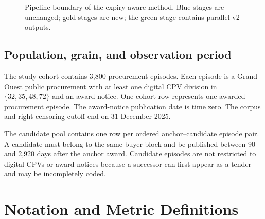 \documentclass[11pt,a4paper]{article}
\begin{document}
\begin{figure}[H]
\centering
{}
\caption{Pipeline boundary of the expiry-aware method. Blue stages are unchanged;
gold stages are new; the green stage contains parallel v2 outputs.}
\label{fig:pipeline}
\end{figure}

\subsection{Population, grain, and observation period}

The study cohort contains 3,800 procurement episodes. Each episode is a Grand Ouest
public procurement with at least one digital CPV division in
$\{32,35,48,72\}$ and an award notice. One cohort row represents one awarded
procurement episode. The award-notice publication date is time zero. The corpus and
right-censoring cutoff end on 31 December 2025.

The candidate pool contains one row per ordered anchor--candidate episode pair. A
candidate must belong to the same buyer block and be published between 90 and 2,920
days after the anchor award. Candidate episodes are not restricted to digital CPVs
or award notices because a successor can first appear as a tender and may be
incompletely coded.

\section{Notation and Metric Definitions}
\end{document}
